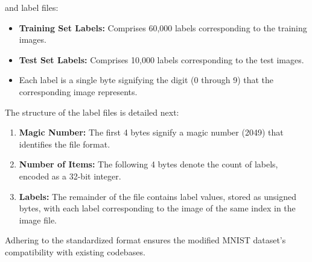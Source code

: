 and label files:

\begin{itemize}
    \item \textbf{Training Set Labels:} Comprises 60,000 labels corresponding to the training images.
    \item \textbf{Test Set Labels:} Comprises 10,000 labels corresponding to the test images.
    \item Each label is a single byte signifying the digit (0 through 9) that the corresponding image represents.
\end{itemize}

The structure of the label files is detailed next:
\begin{enumerate}
    \item \textbf{Magic Number:} The first 4 bytes signify a magic number (2049) that identifies the file format.
    \item \textbf{Number of Items:} The following 4 bytes denote the count of labels, encoded as a 32-bit integer.
    \item \textbf{Labels:} The remainder of the file contains label values, stored as unsigned bytes, with each label corresponding to the image of the same index in the image file.
\end{enumerate}

Adhering to the standardized format ensures the modified MNIST dataset's compatibility with existing codebases.

